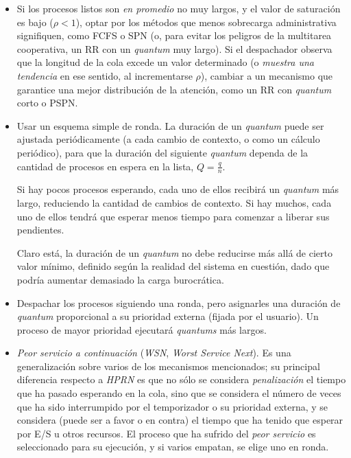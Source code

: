 \documentclass[11pt,fleqn]{book} %
\begin{document}
\begin{itemize}
\item Si los procesos listos son \emph{en promedio} no muy largos, y el valor
  de saturación es bajo ($\rho < 1$), optar por los métodos que menos
  sobrecarga administrativa signifiquen, como FCFS o SPN (o, para
  evitar los peligros de la multitarea cooperativa, un RR con un
  \emph{quantum} muy largo). Si el despachador observa que la longitud de
  la cola excede un valor determinado (o \emph{muestra una tendencia} en
  ese sentido, al incrementarse $\rho$), cambiar a un mecanismo que
  garantice una mejor distribución de la atención, como un RR con
  \emph{quantum} corto o PSPN.
\item Usar un esquema simple de ronda. La duración de un \emph{quantum} puede
  ser ajustada periódicamente (a cada cambio de contexto, o como un
  cálculo periódico), para que la duración del siguiente \emph{quantum}
  dependa de la cantidad de procesos en espera en la lista,
  $Q=\frac{q}{n}$.

  Si hay pocos procesos esperando, cada uno de ellos recibirá un
  \emph{quantum} más largo, reduciendo la cantidad de cambios de
  contexto. Si hay muchos, cada uno de ellos tendrá que esperar menos
  tiempo para comenzar a liberar sus pendientes.

  Claro está, la duración de un \emph{quantum} no debe reducirse más allá
  de cierto valor mínimo, definido según la realidad del sistema en
  cuestión, dado que podría aumentar demasiado la carga burocrática.
\item Despachar los procesos siguiendo una ronda, pero asignarles una
  duración de \emph{quantum} proporcional a su prioridad externa (fijada
  por el usuario). Un proceso de mayor prioridad ejecutará \emph{quantums}
  más largos.
\item \emph{Peor servicio a continuación} (\emph{WSN}, \emph{Worst Service Next}). Es
  una generalización sobre varios de los mecanismos mencionados; su
  principal diferencia respecto a \emph{HPRN} es que no sólo se considera
  \emph{penalización} el tiempo que ha pasado esperando en la cola, sino
  que se considera el número de veces que ha sido interrumpido por el
  temporizador o su prioridad externa, y se considera (puede ser a
  favor o en contra) el tiempo que ha tenido que esperar por E/S u
  otros recursos. El proceso que ha sufrido del \emph{peor servicio} es
  seleccionado para su ejecución, y si varios empatan, se elige uno
  en ronda.


\end{itemize}
\end{document}
